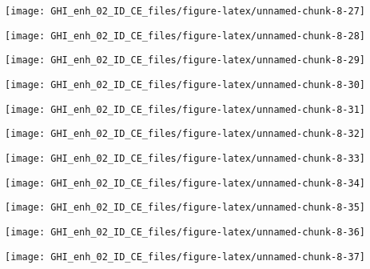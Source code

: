 \documentclass[
  10pt,
  a4paper,oneside]{article}
\begin{document}
\begin{center}\texttt{[image: GHI\_enh\_02\_ID\_CE\_files/figure-latex/unnamed-chunk-8-27]} \end{center}

\begin{center}\texttt{[image: GHI\_enh\_02\_ID\_CE\_files/figure-latex/unnamed-chunk-8-28]} \end{center}

\begin{center}\texttt{[image: GHI\_enh\_02\_ID\_CE\_files/figure-latex/unnamed-chunk-8-29]} \end{center}

\begin{center}\texttt{[image: GHI\_enh\_02\_ID\_CE\_files/figure-latex/unnamed-chunk-8-30]} \end{center}

\begin{center}\texttt{[image: GHI\_enh\_02\_ID\_CE\_files/figure-latex/unnamed-chunk-8-31]} \end{center}

\begin{center}\texttt{[image: GHI\_enh\_02\_ID\_CE\_files/figure-latex/unnamed-chunk-8-32]} \end{center}

\begin{center}\texttt{[image: GHI\_enh\_02\_ID\_CE\_files/figure-latex/unnamed-chunk-8-33]} \end{center}

\begin{center}\texttt{[image: GHI\_enh\_02\_ID\_CE\_files/figure-latex/unnamed-chunk-8-34]} \end{center}

\begin{center}\texttt{[image: GHI\_enh\_02\_ID\_CE\_files/figure-latex/unnamed-chunk-8-35]} \end{center}

\begin{center}\texttt{[image: GHI\_enh\_02\_ID\_CE\_files/figure-latex/unnamed-chunk-8-36]} \end{center}

\begin{center}\texttt{[image: GHI\_enh\_02\_ID\_CE\_files/figure-latex/unnamed-chunk-8-37]} \end{center}
\end{document}
